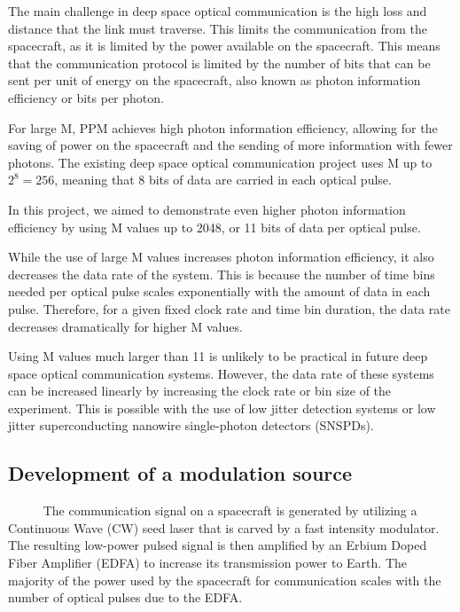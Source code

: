 \documentclass[12pt]{caltech_thesis}
\begin{document}
The main challenge in deep space optical communication is the high loss
and distance that the link must traverse. This limits the communication
from the spacecraft, as it is limited by the power available on the
spacecraft. This means that the communication protocol is limited by the
number of bits that can be sent per unit of energy on the spacecraft,
also known as photon information efficiency or bits per photon.

For large M, PPM achieves high photon information efficiency, allowing
for the saving of power on the spacecraft and the sending of more
information with fewer photons. The existing deep space optical
communication project uses M up to \(2^8 = 256\), meaning that 8 bits of
data are carried in each optical pulse.

In this project, we aimed to demonstrate even higher photon information
efficiency by using M values up to 2048, or 11 bits of data per optical
pulse.

While the use of large M values increases photon information efficiency,
it also decreases the data rate of the system. This is because the
number of time bins needed per optical pulse scales exponentially with
the amount of data in each pulse. Therefore, for a given fixed clock
rate and time bin duration, the data rate decreases dramatically for
higher M values.

Using M values much larger than 11 is unlikely to be practical in future
deep space optical communication systems. However, the data rate of
these systems can be increased linearly by increasing the clock rate or
bin size of the experiment. This is possible with the use of low jitter
detection systems or low jitter superconducting nanowire single-photon
detectors (SNSPDs).

\hypertarget{development-of-a-modulation-source}{%
\subsection{Development of a modulation
source}\label{development-of-a-modulation-source}}

~~~~~ The communication signal on a spacecraft is generated by utilizing
a Continuous Wave (CW) seed laser that is carved by a fast intensity
modulator. The resulting low-power pulsed signal is then amplified by an
Erbium Doped Fiber Amplifier (EDFA) to increase its transmission power
to Earth. The majority of the power used by the spacecraft for
communication scales with the number of optical pulses due to the EDFA.
\end{document}
